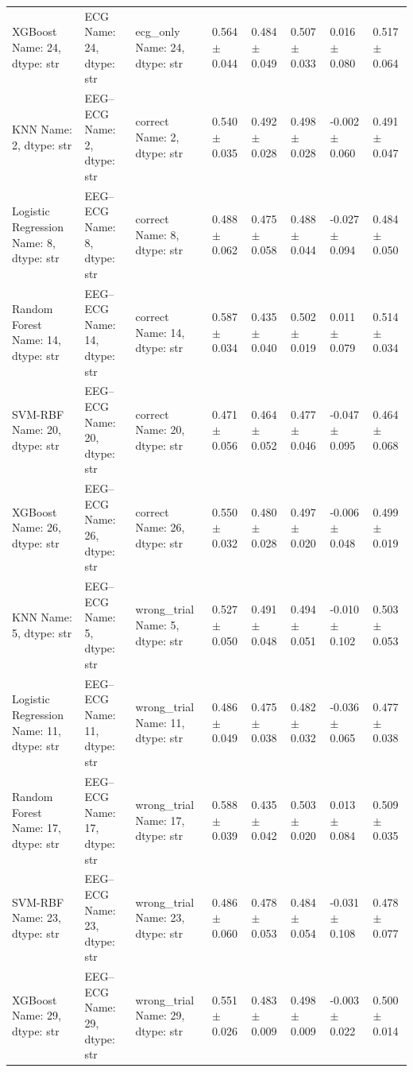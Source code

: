 \begin{table}[!t]
\begin{tabular}{llllllll}
    XGBoost
Name: 24, dtype: str &     ECG
Name: 24, dtype: str &     ecg_only
Name: 24, dtype: str & 0.564 $\pm$ 0.044 & 0.484 $\pm$ 0.049 & 0.507 $\pm$ 0.033 & 0.016 $\pm$ 0.080 & 0.517 $\pm$ 0.064 \\
    KNN
Name: 2, dtype: str &     EEG--ECG
Name: 2, dtype: str &     correct
Name: 2, dtype: str & 0.540 $\pm$ 0.035 & 0.492 $\pm$ 0.028 & 0.498 $\pm$ 0.028 & -0.002 $\pm$ 0.060 & 0.491 $\pm$ 0.047 \\
    Logistic Regression
Name: 8, dtype: str &     EEG--ECG
Name: 8, dtype: str &     correct
Name: 8, dtype: str & 0.488 $\pm$ 0.062 & 0.475 $\pm$ 0.058 & 0.488 $\pm$ 0.044 & -0.027 $\pm$ 0.094 & 0.484 $\pm$ 0.050 \\
    Random Forest
Name: 14, dtype: str &     EEG--ECG
Name: 14, dtype: str &     correct
Name: 14, dtype: str & 0.587 $\pm$ 0.034 & 0.435 $\pm$ 0.040 & 0.502 $\pm$ 0.019 & 0.011 $\pm$ 0.079 & 0.514 $\pm$ 0.034 \\
    SVM-RBF
Name: 20, dtype: str &     EEG--ECG
Name: 20, dtype: str &     correct
Name: 20, dtype: str & 0.471 $\pm$ 0.056 & 0.464 $\pm$ 0.052 & 0.477 $\pm$ 0.046 & -0.047 $\pm$ 0.095 & 0.464 $\pm$ 0.068 \\
    XGBoost
Name: 26, dtype: str &     EEG--ECG
Name: 26, dtype: str &     correct
Name: 26, dtype: str & 0.550 $\pm$ 0.032 & 0.480 $\pm$ 0.028 & 0.497 $\pm$ 0.020 & -0.006 $\pm$ 0.048 & 0.499 $\pm$ 0.019 \\
    KNN
Name: 5, dtype: str &     EEG--ECG
Name: 5, dtype: str &     wrong_trial
Name: 5, dtype: str & 0.527 $\pm$ 0.050 & 0.491 $\pm$ 0.048 & 0.494 $\pm$ 0.051 & -0.010 $\pm$ 0.102 & 0.503 $\pm$ 0.053 \\
    Logistic Regression
Name: 11, dtype: str &     EEG--ECG
Name: 11, dtype: str &     wrong_trial
Name: 11, dtype: str & 0.486 $\pm$ 0.049 & 0.475 $\pm$ 0.038 & 0.482 $\pm$ 0.032 & -0.036 $\pm$ 0.065 & 0.477 $\pm$ 0.038 \\
    Random Forest
Name: 17, dtype: str &     EEG--ECG
Name: 17, dtype: str &     wrong_trial
Name: 17, dtype: str & 0.588 $\pm$ 0.039 & 0.435 $\pm$ 0.042 & 0.503 $\pm$ 0.020 & 0.013 $\pm$ 0.084 & 0.509 $\pm$ 0.035 \\
    SVM-RBF
Name: 23, dtype: str &     EEG--ECG
Name: 23, dtype: str &     wrong_trial
Name: 23, dtype: str & 0.486 $\pm$ 0.060 & 0.478 $\pm$ 0.053 & 0.484 $\pm$ 0.054 & -0.031 $\pm$ 0.108 & 0.478 $\pm$ 0.077 \\
    XGBoost
Name: 29, dtype: str &     EEG--ECG
Name: 29, dtype: str &     wrong_trial
Name: 29, dtype: str & 0.551 $\pm$ 0.026 & 0.483 $\pm$ 0.009 & 0.498 $\pm$ 0.009 & -0.003 $\pm$ 0.022 & 0.500 $\pm$ 0.014 \\

\end{tabular}
\end{table}
